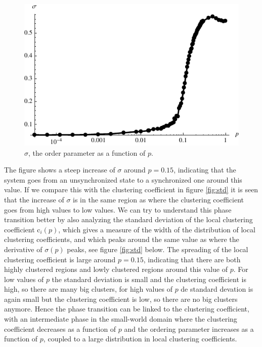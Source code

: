\documentclass[10pt,a4paper]{article}
\begin{document}
\begin{figure}[H]
  \centering
  \includegraphics[scale=1.1]{sigma.pdf}
  \caption{$\sigma$, the order parameter as a function of $p$.}
  \label{fig:sigma}
\end{figure}

\noindent The figure shows a steep increase of $\sigma$ around $p = 0.15$, indicating that the system goes from an unsynchronized state to a synchronized one around this value. If we compare this with the clustering coefficient in figure \ref{fig:std} it is seen that the increase of $\sigma$ is in the same region as where the clustering coefficient goes from high values to low values. We can try to understand this phase transition better by also analyzing the standard deviation of the local clustering coefficient $\text{c}_{i}(p)$, which gives a measure of the width of the distribution of local clustering coefficients, and which peaks around the same value as where the derivative of $\sigma(p)$ peaks, see figure \ref{fig:std} below. The spreading of the local clustering coefficient is large around $p = 0.15$, indicating that there are both highly clustered regions and lowly clustered regions around this value of $p$. For low values of $p$ the standard deviation is small and the clustering coefficient is high, so there are many big clusters, for high values of $p$ de standard devation is again small but the clustering coefficient is low, so there are no big clusters anymore. Hence the phase transition can be linked to the clustering coefficient, with an intermediate phase in the small-world domain where the clustering coefficient decreases as a function of $p$ and the ordering parameter increases as a function of $p$, coupled to a large distribution in local clustering coefficients.
\end{document}
